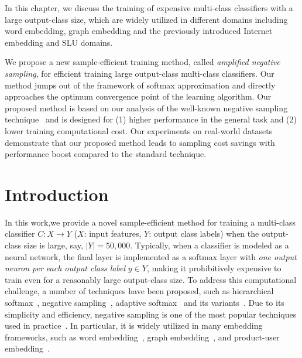 In this chapter, we discuss  the training of expensive multi-class classifiers with a large output-class size, which are widely utilized in different domains including word embedding, graph embedding and the previously introduced Internet embedding and SLU domains.   

We  propose a new sample-efficient training method, called \emph{amplified negative sampling}, for efficient training  large output-class multi-class classifiers. Our method jumps out of the framework of softmax approximation and directly approaches the optimum convergence point of the learning algorithm. Our proposed method is based on our  analysis of the well-known negative sampling technique~\citep{mikolov2013distributed} and is designed for (1) higher performance in the general task and (2) lower training computational cost. Our experiments on real-world datasets demonstrate that our proposed method leads to sampling cost savings with performance boost compared to the standard technique.

\section{Introduction}

In this work,we provide a novel sample-efficient method for training a multi-class classifier $C: X \rightarrow Y$ ($X$: input features, $Y$: output class labels) when the output-class size is large, say, $\vert Y \vert = 50,000$. Typically, when a classifier is modeled as a neural network, the final layer is implemented as a softmax layer with \emph{one output neuron per each output class label} $y \in Y$, making it prohibitively expensive to train even for a reasonably large output-class size. To address this computational challenge, a number of techniques have been proposed, such as hierarchical softmax~\citep{morin2005hierarchical}, negative sampling~\citep{mikolov2013efficient}, adaptive softmax~\citep{bengio2008adaptive} and its variants~\citep{rawat2019sampled,blanc2017adaptive,grave2017efficient,chen2015strategies,bai2017tapas}. Due to its simplicity and efficiency, negative sampling is one of the most popular techniques used in practice~\citep{mikolov2013distributed,wang2017knowledge,node2vec-kdd2016,barkan2016item2vec}. In particular, it is widely utilized in many embedding frameworks, such as word embedding~\citep{mikolov2013distributed}, graph embedding~\citep{node2vec-kdd2016,wang2017knowledge}, and product-user embedding~\citep{barkan2016item2vec}.


